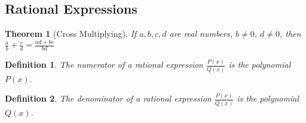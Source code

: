 \documentclass{article}
\theoremstyle{mystyle}
\newtheorem{theorem}{Theorem}[section]
\newtheorem{definition}{Definition}[section]
\begin{document}
\subsection{Rational Expressions}
\begin{theorem}[Cross Multiplying]
\label{theorem:north_shore_cross_multiplying}
If $a,b,c,d$ are real numbers, $b\ne 0$, $d\ne 0$, then $\frac{a}{b} +\frac{c}{d} = \frac{ad+bc}{bd}$
\end{theorem}
\begin{definition}
\label{definition:north_shore_numerator_of_rational_expression}
The numerator of a rational expression $\frac{P(x)}{Q(x)}$ is the polynomial $P(x)$.
\end{definition}
\begin{definition}
\label{definition:north_shore_denominator_of_rational_expression}
The denominator of a rational expression $\frac{P(x)}{Q(x)}$ is the polynomial $Q(x)$.
\end{definition}
\end{document}
